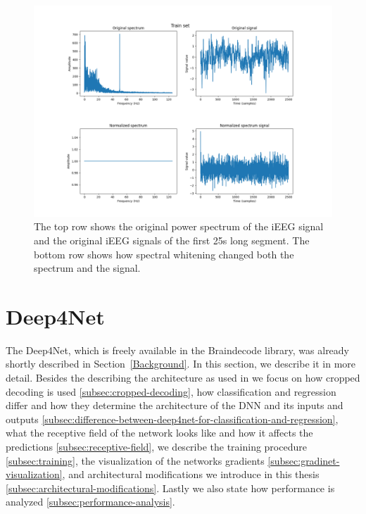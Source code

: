 \begin{itemize}
\begin{figure}[!htbp]
\centering
\includegraphics[width=\linewidth]{img/ch3/spectral-whitening}
\caption[Spectral whitening on the train set]{The top row shows the original power spectrum of the iEEG signal and the original iEEG signals of the first 25s long segment.
The bottom row shows how spectral whitening changed both the spectrum and the signal.}
\label{fig:spectral-whitening}
\end{figure}
\end{itemize}

\section{Deep4Net}\label{sec:deep4net}
The Deep4Net, which is freely available in the Braindecode library, was already shortly described in Section~\ref{Background}.
In this section, we describe it in more detail. 
Besides the describing the architecture as used in \cite{Hammer-2021} we focus on how cropped decoding is used \ref{subsec:cropped-decoding}, how classification and regression differ and how they determine the architecture of the DNN and its inputs and outputs \ref{subsec:difference-between-deep4net-for-classification-and-regression}, what the receptive field of the network looks like and how it affects the predictions \ref{subsec:receptive-field}, we describe the training procedure \ref{subsec:training}, the visualization of the networks gradients \ref{subsec:gradinet-visualization}, and architectural modifications we introduce in this thesis \ref{subsec:architectural-modifications}. Lastly we also state how performance is analyzed \ref{subsec:performance-analysis}.


